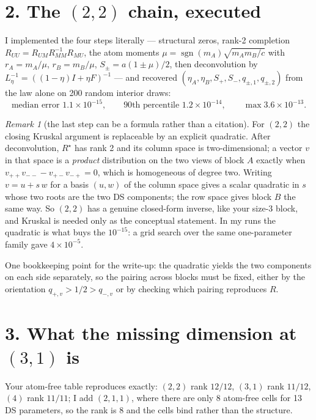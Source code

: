 \documentclass[11pt]{article}
\theoremstyle{remark}
\newtheorem*{remark}{Remark}
\begin{document}
\section*{2. The $(2,2)$ chain, executed}

I implemented the four steps literally --- structural zeros, rank-2 completion $R_{UU}=R_{UM}R_{MM}^{-1}R_{MU}$, the atom moments $\mu=\operatorname{sgn}(m_A)\sqrt{m_Am_B/c}$ with $r_A=m_A/\mu$, $r_B=m_B/\mu$, $S_\pm=a(1\pm\mu)/2$, then deconvolution by $L_\eta^{-1}=((1-\eta)I+\eta F)^{-1}$ --- and recovered $(\eta_A,\eta_B,S_+,S_-,q_{\pm,1},q_{\pm,2})$ from the law alone on 200 random interior draws:
\[
\text{median error }1.1\times10^{-15},\qquad 90\text{th percentile }1.2\times10^{-14},\qquad\max 3.6\times10^{-13}.
\]

\begin{remark}[the last step can be a formula rather than a citation]
For $(2,2)$ the closing Kruskal argument is replaceable by an explicit quadratic. After deconvolution, $R^\star$ has rank 2 and its column space is two-dimensional; a vector $v$ in that space is a \emph{product} distribution on the two views of block $A$ exactly when $v_{++}v_{--}-v_{+-}v_{-+}=0$, which is homogeneous of degree two. Writing $v=u+s\,w$ for a basis $(u,w)$ of the column space gives a scalar quadratic in $s$ whose two roots are the two DS components; the row space gives block $B$ the same way. So $(2,2)$ has a genuine closed-form inverse, like your size-3 block, and Kruskal is needed only as the conceptual statement. In my runs the quadratic is what buys the $10^{-15}$: a grid search over the same one-parameter family gave $4\times10^{-5}$.

One bookkeeping point for the write-up: the quadratic yields the two components on each side separately, so the pairing across blocks must be fixed, either by the orientation $q_{+,v}>1/2>q_{-,v}$ or by checking which pairing reproduces $R$.
\end{remark}

\section*{3. What the missing dimension at $(3,1)$ is}

Your atom-free table reproduces exactly: $(2,2)$ rank $12/12$, $(3,1)$ rank $11/12$, $(4)$ rank $11/11$; I add $(2,1,1)$, where there are only 8 atom-free cells for 13 DS parameters, so the rank is 8 and the cells bind rather than the structure.
\end{document}

